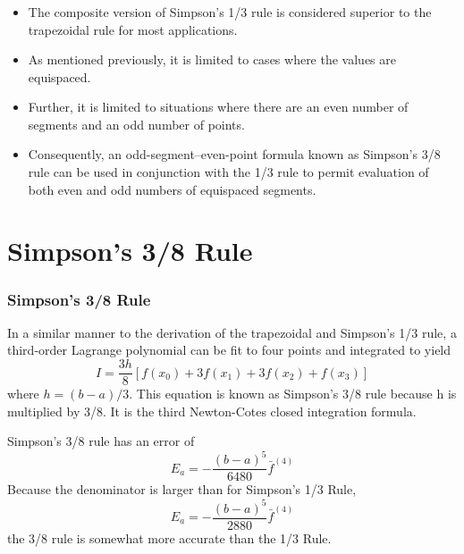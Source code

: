 \documentclass{if-beamer}
\begin{document}
\begin{frame}
	\frametitle{}
	\begin{itemize}
		\item The composite version of Simpson’s 1/3 rule is considered superior to the trapezoidal rule for most applications.\\\vspace{10pt}
		\item As mentioned previously, it is
		limited to cases where the values are equispaced. \\\vspace{10pt}
		\item Further, it is limited to situations where
		there are an even number of segments and an odd number of points. \\\vspace{10pt}
		\item  Consequently, an odd-segment–even-point formula known as Simpson’s 3/8 rule can be used in conjunction with the 1/3 rule to permit evaluation of both even and odd numbers of equispaced segments.
	\end{itemize}
\end{frame}

\section{Simpson's 3/8 Rule}
\begin{frame}[t]
	\frametitle{Simpson's 3/8 Rule}
	In a similar manner to the derivation of the trapezoidal and Simpson’s 1/3 rule, a third-order Lagrange polynomial can be fit to four points and integrated to yield
	$$I =\frac{3h}{8}[f(x_0)+3f(x_1)+3f(x_2)+f(x_3)]$$
	where $h=(b-a)/3$. This equation is known as Simpson's 3/8 rule because h is multiplied
	by 3/8. It is the third Newton-Cotes closed integration formula. \\\vspace{10pt}
	
	Simpson’s 3/8 rule has an error of
	$$E_a = -\frac{(b-a)^5}{6480}\bar{f}^{(4)} $$ 
	Because the denominator is larger than for Simpson's 1/3 Rule, 
	$$E_a = -\frac{(b-a)^5}{2880}\bar{f}^{(4)} $$
	the 3/8 rule is somewhat more accurate than the 1/3 Rule.
\end{frame}
\end{document}
